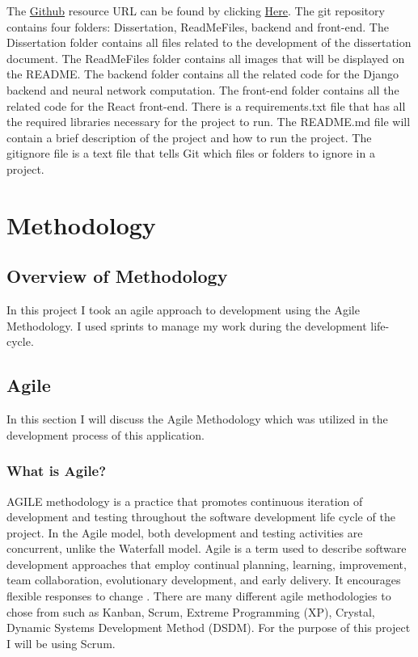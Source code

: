 The \href{https://github.com/MarkReillyGMIT/AppliedProject}{Github} resource URL can be found by clicking \href{https://github.com/MarkReillyGMIT/AppliedProject}{Here}. The git repository contains four folders: Dissertation, ReadMeFiles, backend and front-end. The Dissertation folder contains all files related to the development of the dissertation document. The ReadMeFiles folder contains all images that will be displayed on the README. The backend folder contains all the related code for the Django backend and neural network computation. The front-end folder contains all the related code for the React front-end. There is a requirements.txt file that has all the required libraries necessary for the project to run. The README.md file will contain a brief description of the project and how to run the project. The gitignore file is a text file that tells Git which files or folders to ignore in a project. 


\chapter{Methodology}

\section{Overview of Methodology}

In this project I took an agile approach to development using the Agile Methodology. I used sprints to manage my work during the development life-cycle.

\section{Agile}
In this section I will discuss the Agile Methodology which was utilized in the development process of this application.

\subsection{What is Agile?}
AGILE methodology is a practice that promotes continuous iteration of development and testing throughout the software development life cycle of the project. In the Agile model, both development and testing activities are concurrent, unlike the Waterfall model\cite{Agile}. Agile is a term used to describe software development approaches that employ continual planning, learning, improvement, team collaboration, evolutionary development, and early delivery. It encourages flexible responses to change \cite{Agile}. There are many different agile methodologies to chose from such as Kanban, Scrum, Extreme Programming (XP), Crystal, Dynamic Systems Development Method (DSDM). For the purpose of this project I will be using Scrum. 


